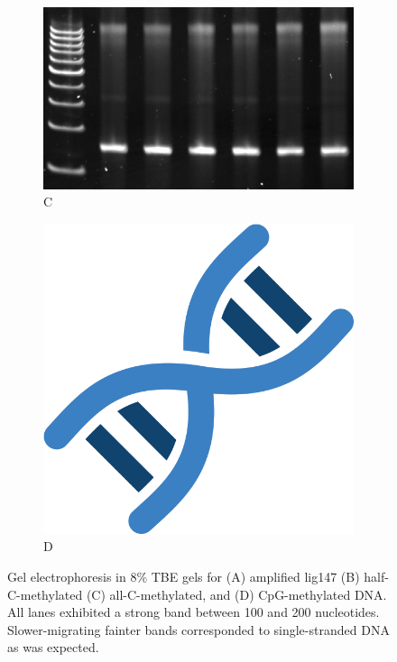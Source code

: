\documentclass[parskip=full, numbers=noenddot]{scrreprt}
\begin{document}
\begin{figure}[htpb]
\begin{subfigure}[htpb]{0.4\textwidth}
    \centering
    \includegraphics[width=\textwidth]{amplig_c}
    \caption{C}
    \label{fig:amplig_c}
  \end{subfigure}
  \begin{subfigure}[htpb]{0.4\textwidth}
    \centering
    \includegraphics[width=\textwidth]{test}
    \caption{D}
    \label{fig:amplig_d}
  \end{subfigure}
  \caption{Gel electrophoresis in 8\% TBE gels for (A) amplified lig147 (B) half-C-methylated (C) all-C-methylated, and (D) CpG-methylated DNA. All lanes exhibited a strong band between 100 and 200 nucleotides. Slower-migrating fainter bands corresponded to single-stranded DNA as was expected.}
  \label{fig:amplig}
\end{figure}
\end{document}
